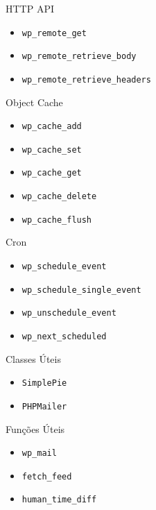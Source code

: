 \documentclass{beamer}
\begin{document}
\begin{frame}{HTTP API}
\begin{itemize}
  \pause \item \texttt{wp\_remote\_get}
  \pause \item \texttt{wp\_remote\_retrieve\_body}
  \pause \item \texttt{wp\_remote\_retrieve\_headers}
\end{itemize}
\end{frame}

\begin{frame}{Object Cache}
\begin{itemize}
  \pause \item \texttt{wp\_cache\_add}
  \pause \item \texttt{wp\_cache\_set}
  \pause \item \texttt{wp\_cache\_get}
  \pause \item \texttt{wp\_cache\_delete}
  \pause \item \texttt{wp\_cache\_flush}
\end{itemize}
\end{frame}

\begin{frame}{Cron}
\begin{itemize}
  \pause \item \texttt{wp\_schedule\_event}
  \pause \item \texttt{wp\_schedule\_single\_event}
  \pause \item \texttt{wp\_unschedule\_event}
  \pause \item \texttt{wp\_next\_scheduled}
\end{itemize}
\end{frame}

\begin{frame}{Classes Úteis}
\begin{itemize}
  \pause \item \texttt{SimplePie}
  \pause \item \texttt{PHPMailer}
\end{itemize}
\end{frame}

\begin{frame}{Funções Úteis}
\begin{itemize}
  \pause \item \texttt{wp\_mail}
  \pause \item \texttt{fetch\_feed}
  \pause \item \texttt{human\_time\_diff}
\end{itemize}
\end{frame}
\end{document}
